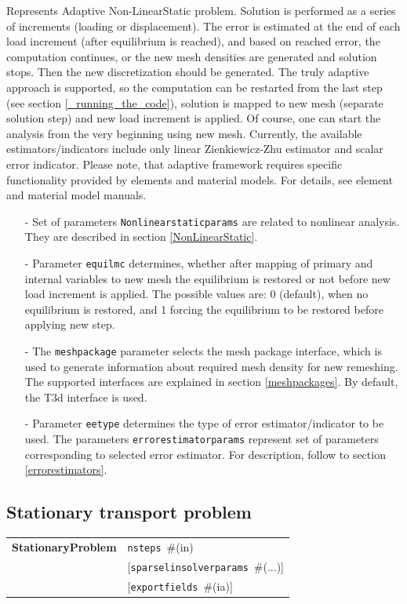 \documentclass[a4paper]{article}
\makeatletter
\newcommand{\param}[1]{\texttt{#1}} %
\newcommand{\optional}[1]{[#1]} %
\newcommand{\field}[2]{\param{#1}~\#{\tiny(#2)}} %
\newcommand{\optField}[2]{\optional{\field{#1}{#2}}}
\newcommand{\entKeywordInst}[1]{\textbf{#1}} %
\newenvironment{record}[1][]{\begin{tabular}{|ll}}{\end{tabular}\\}
\newcommand{\recentry}[2]{{#1}&{#2}\\}
\newcounter{rcc}
\newenvironment{record}[1][\textwidth]{\setcounter{rcc}{0}\begin{tabular*}{#1}{|ll@{\extracolsep{\fill}}r}}{\end{tabular*}\\}
\newcommand{\recentry}[2]{\ifthenelse{\value{rcc}>0}{&$\backslash$ \\}{\setcounter{rcc}{1}}{#1}&{#2}}
\makeatother
\begin{document}
Represents Adaptive Non-LinearStatic problem. Solution is performed  as a series of increments (loading or displacement).
The error is estimated at the end of each load increment (after
equilibrium is reached), and based on reached error, the computation
continues, or the new mesh densities are generated and solution
stops. Then the new discretization should be generated.
The truly adaptive approach is supported, so the computation can be
restarted from the last step (see section \ref{_running_the_code}), solution is mapped to new mesh (separate
solution step) and new load increment is applied. Of course, one can start the analysis from
the very beginning using new mesh. Currently, the available
estimators/indicators include only linear
Zienkiewicz-Zhu estimator and scalar error indicator. Please note, that adaptive framework requires
specific functionality provided by elements and material models. For
details, see element and material model manuals.
\begin{itemize}
\item[-]
Set of parameters \param{Nonlinearstaticparams} are related to
nonlinear analysis. They are described in section
\ref{NonLinearStatic}.
\item[-]
Parameter \param{equilmc} determines, whether after mapping of primary
and internal variables to new mesh the equilibrium is restored or not
before new load increment is applied. The possible values are: 0
(default), when no equilibrium is restored, and 1 forcing the
equilibrium to be restored before applying new step.
\item[-]
The \param{meshpackage} parameter selects the mesh package interface,
which is used to generate information about required mesh density for
new remeshing. The supported interfaces are explained in section
\ref{meshpackages}. By default, the T3d interface is used.
\item[-]
Parameter \param{eetype} determines the type of error
estimator/indicator to be used. The parameters
\param{errorestimatorparams} represent set of parameters corresponding
to selected error estimator. For description, follow to section
\ref{errorestimators}.
\end{itemize}
%

\subsection{Stationary transport problem}
\label{StationaryTransport}

\begin{record}
  \recentry{\entKeywordInst{StationaryProblem}}{\field{nsteps}{in}}
  \recentry{}{\optField{sparselinsolverparams}{...}}
  \recentry{}{\optField{exportfields}{ia}}
\end{record}
\end{document}
